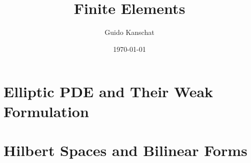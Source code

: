 \documentclass[USEnglish,ignorenonframetext,notheorems,aspectratio=1610]{beamer}
\title{Finite Elements}
\author{Guido Kanschat}
\date{\today}
\begin{document}
\frame{\maketitle}
\section{Elliptic PDE and Their Weak Formulation}

\frame {}
\frame {}
\frame {
  }
\frame {}
\frame {}
\frame {}
\frame {}
\frame {}
\frame {
  }
\frame {}
\frame {}
\frame {
  }
\frame {}
\frame {
  }
\frame {
  }
\frame {
  }

\section{Hilbert Spaces and Bilinear Forms}

\frame {}
\frame {
  }
\frame {}
\frame {}
\frame {}
\frame {}
\frame {}
\frame {}
\frame {}
\frame {}
\frame {}
\frame {}
\frame {}
\frame {}
\frame {
  }
\end{document}
